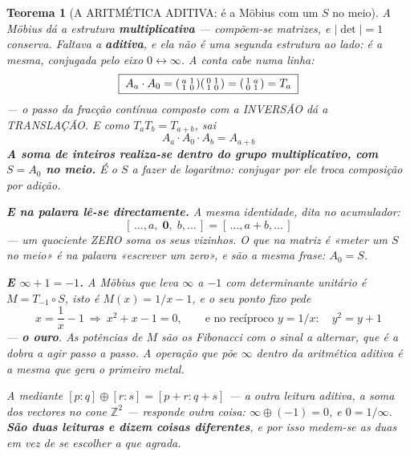 \documentclass[11pt,a4paper]{article}
\newtheorem{teorema}{Teorema}
\newcommand{\abs}[1]{\lvert #1\rvert}
\begin{document}
\begin{teorema}[A ARITMÉTICA ADITIVA: é a Möbius com um $S$ no meio]\label{thm:aditiva}
A Möbius dá a estrutura \textbf{multiplicativa} --- compõem-se matrizes, e $\abs{\det}=1$
conserva. Faltava a \textbf{aditiva}, e ela não é uma segunda estrutura ao lado: é a
mesma, conjugada pelo eixo $0\leftrightarrow\infty$. A conta cabe numa linha:
\[
\boxed{\;A_a\cdot A_0=\begin{psmallmatrix}a&1\\1&0\end{psmallmatrix}
\begin{psmallmatrix}0&1\\1&0\end{psmallmatrix}
=\begin{psmallmatrix}1&a\\0&1\end{psmallmatrix}=T_a\;}
\]
--- \emph{o passo da fracção contínua composto com a INVERSÃO dá a TRANSLAÇÃO}. E como
$T_aT_b=T_{a+b}$, sai
\[
\boxed{\;A_a\cdot A_0\cdot A_b=A_{a+b}\;}
\]
\textbf{A soma de inteiros realiza-se dentro do grupo multiplicativo, com $S=A_0$ no
meio.} É o $S$ a fazer de logaritmo: conjugar por ele troca composição por adição.

\textbf{E na palavra lê-se directamente.} A mesma identidade, dita no acumulador:
\[
\boxed{\;[\,\ldots,a,\;\mathbf{0},\;b,\ldots\,]=[\,\ldots,a+b,\ldots\,]\;}
\]
--- \emph{um quociente ZERO soma os seus vizinhos}. O que na matriz é «meter um $S$ no
meio» é na palavra «escrever um zero», e são a mesma frase: $A_0=S$.

\medskip
\noindent\textbf{E $\infty+1=-1$.} A Möbius que leva $\infty$ a $-1$ com determinante
unitário é $M=T_{-1}\circ S$, isto é $M(x)=1/x-1$, e o seu ponto fixo pede
\[
x=\frac1x-1\ \Longrightarrow\ x^{2}+x-1=0,
\qquad\text{e no recíproco } y=1/x:\quad y^{2}=y+1
\]
--- \textbf{o ouro}. As potências de $M$ são os Fibonacci com o sinal a alternar, que é
a dobra a agir passo a passo. \emph{A operação que põe $\infty$ dentro da aritmética
aditiva é a mesma que gera o primeiro metal.}

A \emph{mediante} $[p{:}q]\oplus[r{:}s]=[p+r{:}q+s]$ --- a outra leitura aditiva, a soma
dos vectores no cone $\mathbb{Z}^2$ --- responde outra coisa: $\infty\oplus(-1)=0$, e
$0=1/\infty$. \textbf{São duas leituras e dizem coisas diferentes}, e por isso medem-se
as duas em vez de se escolher a que agrada.


\end{teorema}
\end{document}

